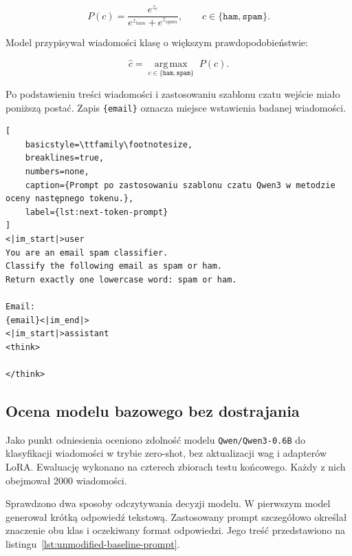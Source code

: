 \[
P(c)=\frac{e^{z_c}}{e^{z_{ham}}+e^{z_{spam}}},
\qquad c\in\{\texttt{ham},\texttt{spam}\}.
\]

Model przypisywał wiadomości klasę o większym prawdopodobieństwie:

\[
\hat{c}=\underset{c\in\{\texttt{ham},\texttt{spam}\}}
{\operatorname{arg\,max}}\;P(c).
\]

Po podstawieniu treści wiadomości i zastosowaniu szablonu czatu wejście miało
poniższą postać. Zapis \texttt{\{email\}} oznacza miejsce wstawienia badanej
wiadomości.

\begin{lstlisting}[
    basicstyle=\ttfamily\footnotesize,
    breaklines=true,
    numbers=none,
    caption={Prompt po zastosowaniu szablonu czatu Qwen3 w metodzie oceny następnego tokenu.},
    label={lst:next-token-prompt}
]
<|im_start|>user
You are an email spam classifier.
Classify the following email as spam or ham.
Return exactly one lowercase word: spam or ham.

Email:
{email}<|im_end|>
<|im_start|>assistant
<think>

</think>

\end{lstlisting}

\subsection{Ocena modelu bazowego bez dostrajania}

Jako punkt odniesienia oceniono zdolność modelu \texttt{Qwen/Qwen3-0.6B} do
klasyfikacji wiadomości w trybie zero-shot, bez aktualizacji wag i adapterów
LoRA. Ewaluację wykonano na czterech zbiorach testu końcowego. Każdy z nich
obejmował 2000 wiadomości.

Sprawdzono dwa sposoby odczytywania decyzji modelu. W pierwszym model generował
krótką odpowiedź tekstową. Zastosowany prompt szczegółowo określał znaczenie
obu klas i oczekiwany format odpowiedzi. Jego treść przedstawiono na
listingu~\ref{lst:unmodified-baseline-prompt}.

